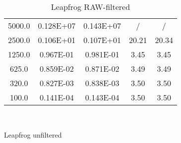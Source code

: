 \documentclass[pdftex,preprint,3p,times,numbers]{elsarticle}
\begin{document}
\begin{table}[!ht]
\begin{subtable}[b]{0.45\textwidth}
{\begin{tabular}{ccccc}
      \hline
      5000.0          &  0.128E+07    &  0.143E+07    & /             & /             \\
      2500.0          &  0.106E+01    &  0.107E+01    & 20.21         & 20.34         \\
      1250.0          &  0.967E-01    &  0.981E-01    &  3.45         &  3.45         \\
       625.0          &  0.859E-02    &  0.871E-02    &  3.49         &  3.49         \\
       320.0          &  0.827E-03    &  0.838E-03    &  3.50         &  3.50         \\
       100.0          &  0.141E-04    &  0.143E-04    &  3.50         &  3.50         \\
      \bottomrule
    \end{tabular}}
  \end{subtable}\\
  \begin{subtable}[b]{0.45\textwidth}
    \centering
    \caption{Leapfrog unfiltered}\label{tab:oscillation-leapfrog}
  \end{subtable}\quad%
  \begin{subtable}[b]{0.45\textwidth}
    \centering
    \caption{Leapfrog RAW-filtered}\label{tab:oscillation-leapfrog-raw}
\end{subtable}
\end{table}
\end{document}

